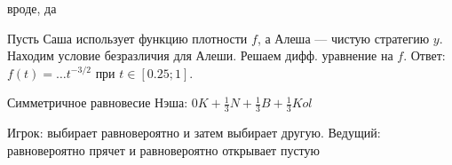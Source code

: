 \begin{solution}{4.78}

\end{solution}
\begin{solution}{4.79}

\end{solution}
\begin{solution}{4.80}
 вроде, да
\end{solution}
\begin{solution}{4.81}
Пусть Саша использует функцию плотности $f$, а Алеша --- чистую стратегию $y$. Находим условие безразличия для Алеши. Решаем дифф. уравнение на $f$. Ответ: $f(t)=\ldots t^{-3/2}$ при $t\in[0.25;1]$.
\end{solution}
\begin{solution}{4.82}
Симметричное равновесие Нэша: $0K+\frac{1}{3}N+\frac{1}{3}B+\frac{1}{3}Kol$
\end{solution}
\begin{solution}{4.83}
Игрок: выбирает равновероятно и затем выбирает другую. Ведущий: равновероятно прячет и равновероятно открывает пустую
\end{solution}
\begin{solution}{5.1}

\end{solution}
\begin{solution}{5.2}

\end{solution}
\begin{solution}{5.3}

\end{solution}
\begin{solution}{5.4}

\end{solution}
\begin{solution}{5.5}

\end{solution}
\begin{solution}{5.6}

\end{solution}
\begin{solution}{5.7}

\end{solution}
\begin{solution}{5.8}

\end{solution}
\begin{solution}{5.9}

\end{solution}
